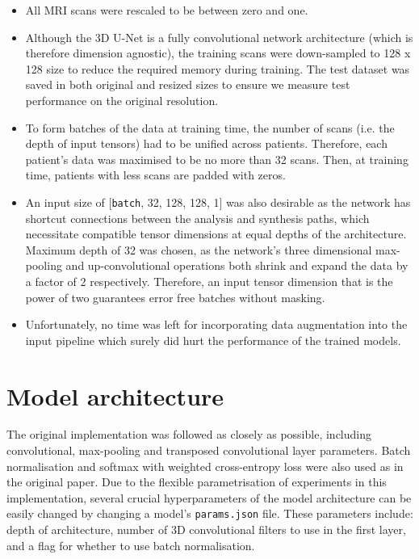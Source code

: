 \documentclass{article}
\begin{document}
\begin{itemize}
	\item All MRI scans were rescaled to be between zero and one.
	\item Although the 3D U-Net is a fully convolutional network architecture (which is therefore dimension agnostic), the training scans were down-sampled to 128 x 128 size to reduce the required memory during training. The test dataset was saved in both original and resized sizes to ensure we measure test performance on the original resolution. 
	\item To form batches of the data at training time, the number of scans (i.e. the depth of input tensors) had to be unified across patients. Therefore, each patient's data was maximised to be no more than 32 scans. Then, at training time, patients with less scans are padded with zeros.
	\item An input size of [\texttt{batch}, 32, 128, 128, 1] was also desirable as the network has shortcut connections between the analysis and synthesis paths, which necessitate compatible tensor dimensions at equal depths of the architecture. Maximum depth of 32 was chosen, as the network's three dimensional max-pooling and up-convolutional operations both shrink and expand the data by a factor of 2 respectively. Therefore, an input tensor dimension that is the power of two guarantees error free batches without masking.
	\item Unfortunately, no time was left for incorporating data augmentation into the input pipeline which surely did hurt the performance of the trained models.
\end{itemize}


\section{Model architecture}

The original implementation was followed as closely as possible, including convolutional, max-pooling and transposed convolutional layer parameters. Batch normalisation \cite{ioffe2015batch} and softmax with weighted cross-entropy loss were also used as in the original paper. Due to the flexible parametrisation of experiments in this implementation, several crucial hyperparameters of the model architecture can be easily changed by changing a model's \texttt{params.json} file. These parameters include: depth of architecture, number of 3D convolutional filters to use in the first layer, and a flag for whether to use batch normalisation.
\end{document}
